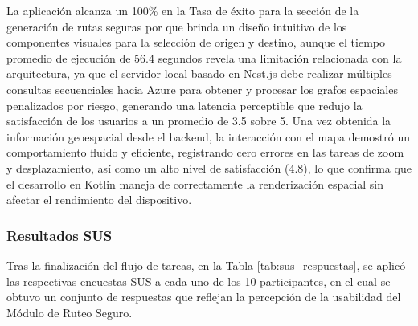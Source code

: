 La aplicación alcanza un 100\% en la Tasa de éxito para la sección de la generación de rutas seguras por que brinda un diseño intuitivo de los componentes visuales para la selección de origen y destino, aunque el tiempo promedio de ejecución de 56.4 segundos revela una limitación relacionada con la arquitectura, ya que el servidor local basado en Nest.js debe realizar múltiples consultas secuenciales hacia Azure para obtener y procesar los grafos espaciales penalizados por riesgo, generando una latencia perceptible que redujo la satisfacción de los usuarios a un promedio de 3.5 sobre 5. Una vez obtenida la información geoespacial desde el backend, la interacción con el mapa demostró un comportamiento fluido y eficiente, registrando cero errores en las tareas de zoom y desplazamiento, así como un alto nivel de satisfacción (4.8), lo que confirma que el desarrollo en Kotlin  maneja de correctamente la renderización espacial sin afectar el rendimiento del dispositivo. 
\subsubsection{Resultados SUS}  
Tras la finalización del flujo de tareas, en la Tabla \ref{tab:sus_respuestas}, se aplicó las respectivas encuestas SUS a cada uno de los 10 participantes, en el cual se obtuvo un conjunto de respuestas que reflejan la percepción de la usabilidad del Módulo de Ruteo Seguro. 

\begin{table}[H]
\centering
\caption{Respuestas de los participantes al cuestionario SUS}
\label{tab:sus_respuestas}
\end{table}

